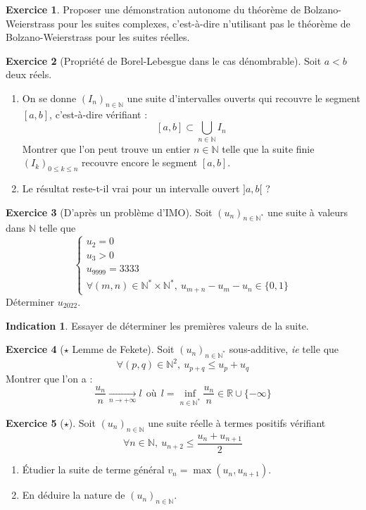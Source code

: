 \documentclass[french]{book}
\newcommand{\N}{\mathbb{N}}
\newcommand{\R}{\mathbb{R}}
\newcommand{\st}{^*}
\theoremstyle{definition}
\newtheorem{ex}{Exercice}[chapter]
\theoremstyle{theorem}
\newtheorem*{ind}{Indication}
\theoremstyle{remark}
\begin{document}
\begin{ex}
	Proposer une démonstration autonome du théorème de Bolzano-Weierstrass pour les suites complexes, c'est-à-dire n'utilisant pas le théorème de Bolzano-Weierstrass pour les suites réelles.
\end{ex}

\begin{ex}[Propriété de Borel-Lebesgue dans le cas dénombrable]
	Soit $a<b$ deux réels.
	\begin{enumerate}
		\item On se donne $(I_n)_{n\in\N}$ une suite d'intervalles ouverts qui recouvre le segment $[a,b]$, c'est-à-dire vérifiant : $$[a,b]\subset\bigcup_{n\in\N}I_n$$ Montrer que l'on peut trouve un entier $n\in\N$ telle que la suite finie $(I_k)_{0\leqslant k\leqslant n}$ recouvre encore le segment $[a,b]$.
		\item Le résultat reste-t-il vrai pour un intervalle ouvert $]a,b[$ ?
	\end{enumerate}
\end{ex}

\begin{ex}[D'après un problème d'IMO]
	Soit $(u_n)_{n\in\N\st}$ une suite à valeurs dans $\N$ telle que $$\begin{cases}
		u_2=0 \\
		u_3>0 \\
		u_{9999}=3333 \\
		\forall (m,n)\in\N\st\times\N\st,\ u_{m+n}-u_m-u_n\in\{0,1\}
	\end{cases}$$ Déterminer $u_{2022}$.
\end{ex}

\begin{ind}
	Essayer de déterminer les premières valeurs de la suite.
\end{ind}

\begin{ex}[$\star$ Lemme de Fekete] Soit $(u_n)_{n\in\N\st}$ sous-additive, \textit{ie} telle que $$\forall(p,q)\in\N^2,\ u_{p+q}\leqslant u_p+u_q$$ Montrer que l'on a : $$\frac{u_n}{n}\xrightarrow[n\to+\infty]{}l \ \ \text{où} \ \ l=\inf_{n\in\N\st}\frac{u_n}{n}\in\R\cup\{-\infty\}$$
\end{ex}

\begin{ex}[$\star$]
	Soit $(u_n)_{n\in\N}$ une suite réelle à termes positifs vérifiant $$\forall n\in\N,\ u_{n+2}\leqslant\displaystyle\frac{u_n+u_{n+1}}{2}$$
	\begin{enumerate}
		\item Étudier la suite de terme général $v_n=\max(u_n,u_{n+1})$.
		\item En déduire la nature de $(u_n)_{n\in\N}$.
	\end{enumerate}
\end{ex}
\end{document}

